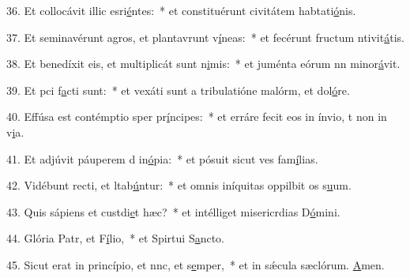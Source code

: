 36. Et collocávit illic esri\uline{é}ntes:~* et constituérunt civitátem habtati\uline{ó}nis.\par 
37. Et seminavérunt agros, et plantavrunt v\uline{í}neas:~* et fecérunt fructum ntivit\uline{á}tis.\par 
38. Et benedíxit eis, et multiplicát sunt n\uline{i}mis:~* et juménta eórum nn minor\uline{á}vit.\par 
39. Et pci f\uline{a}cti sunt:~* et vexáti sunt a tribulatióne malórm, et dol\uline{ó}re.\par 
40. Effúsa est contémptio sper pr\uline{í}ncipes:~* et erráre fecit eos in ínvio, t non in v\uline{i}a.\par 
41. Et adjúvit páuperem d in\uline{ó}pia:~* et pósuit sicut ves fam\uline{í}lias.\par 
42. Vidébunt recti, et ltab\uline{ú}ntur:~* et omnis iníquitas oppilbit os s\uline{u}um.\par 
43. Quis sápiens et custdi\uline{e}t hæc?~* et intélliget misericrdias D\uline{ó}mini.\par 
44. Glória Patr, et F\uline{í}lio,~* et Spirtui S\uline{a}ncto.\par 
45. Sicut erat in princípio, et nnc, et s\uline{e}mper,~* et in sǽcula sæclórum. \uline{A}men.\par 
